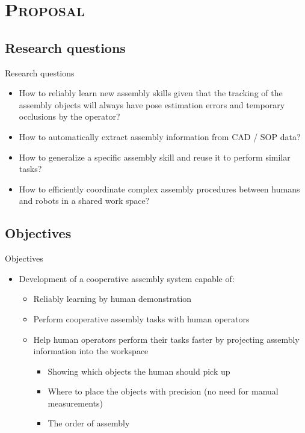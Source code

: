 \section{\scshape Proposal}\label{sec:proposal}

\subsection{Research questions}
\begin{frame}{Research questions}
	\begin{itemize}
		\item How to reliably learn new assembly skills given that the tracking of the assembly objects will always have pose estimation errors and temporary occlusions by the operator?
			\item How to automatically extract assembly information from CAD / SOP data?
		\item How to generalize a specific assembly skill and reuse it to perform similar tasks?
		\item How to efficiently coordinate complex assembly procedures between humans and robots in a shared work space?
	\end{itemize}
\end{frame}

\subsection{Objectives}
\begin{frame}{Objectives}
	\begin{itemize}
		\item Development of a cooperative assembly system capable of:
		\begin{itemize}
			\item Reliably learning by human demonstration
			\item Perform cooperative assembly tasks with human operators
			\item Help human operators perform their tasks faster by projecting assembly information into the workspace
			\begin{itemize}
				\item Showing which objects the human should pick up
				\item Where to place the objects with precision (no need for manual measurements)
				\item The order of assembly
			\end{itemize}
		\end{itemize}

	\end{itemize}
\end{frame}

